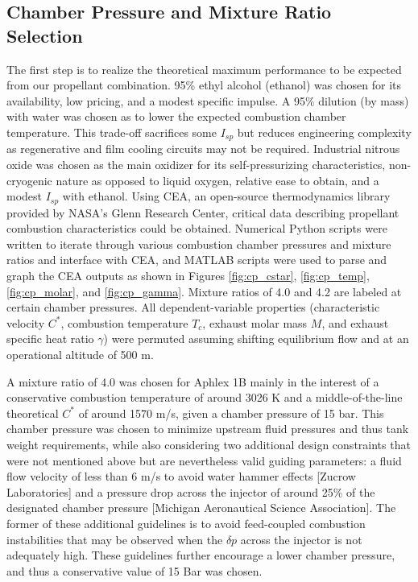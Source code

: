 \documentclass[9pt]{article} %
\numberwithin{equation}{section} %
\begin{document}
\subsection{Chamber Pressure and Mixture Ratio Selection}
\hspace{\parindent} The first step is to realize the theoretical maximum performance to be expected from our propellant combination.  95\% ethyl alcohol (ethanol) was chosen for its availability, low pricing, and a modest specific impulse. A 95\% dilution (by mass) with water was chosen as to lower the expected combustion chamber temperature. This trade-off sacrifices some $I_{sp}$ but reduces engineering complexity as regenerative and film cooling circuits may not be required. Industrial nitrous oxide was chosen as the main oxidizer for its self-pressurizing characteristics, non-cryogenic nature as opposed to liquid oxygen, relative ease to obtain, and a modest $I_{sp}$ with ethanol.
Using CEA, an open-source thermodynamics library provided by NASA's Glenn Research Center, critical data describing propellant combustion characteristics could be obtained. Numerical Python scripts were written to iterate through various combustion chamber pressures and mixture ratios and interface with CEA, and MATLAB scripts were used to parse and graph the CEA outputs as shown in Figures \ref{fig:cp_cstar}, \ref{fig:cp_temp}, \ref{fig:cp_molar}, and \ref{fig:cp_gamma}. Mixture ratios of 4.0 and 4.2 are labeled at certain chamber pressures. All dependent-variable properties (characteristic velocity $C^{*}$, combustion temperature $T_{c}$, exhaust molar mass $M$, and exhaust specific heat ratio $\gamma$) were permuted assuming shifting equilibrium flow and at an operational altitude of 500 m. 

A mixture ratio of 4.0 was chosen for Aphlex 1B mainly in the interest of a conservative combustion temperature of around 3026 K and a middle-of-the-line theoretical $C^{*}$ of around 1570 m/s, given a chamber pressure of 15 bar. This chamber pressure was chosen to minimize upstream fluid pressures and thus tank weight requirements, while also considering two additional design constraints that were not mentioned above but are nevertheless valid guiding parameters: a fluid flow velocity of less than 6 m/s to avoid water hammer effects [Zucrow Laboratories] and a pressure drop across the injector of around 25\% of the designated chamber pressure [Michigan Aeronautical Science Association]. The former of these additional guidelines is to avoid feed-coupled combustion instabilities that may be observed when the $\delta p$ across the injector is not adequately high. These guidelines further encourage a lower chamber pressure, and thus a conservative value of 15 Bar was chosen.
\end{document}
